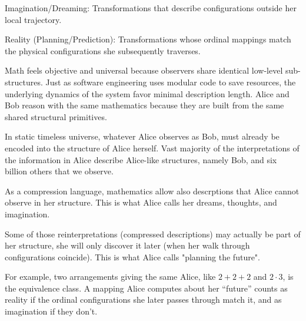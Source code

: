 Imagination/Dreaming: Transformations that describe configurations outside her local trajectory.

Reality (Planning/Prediction): Transformations whose ordinal mappings match the physical configurations she subsequently traverses.

Math feels objective and universal because observers share identical low-level sub-structures. 
Just as software engineering uses modular code to save resources, the underlying dynamics of the system favor minimal description length. 
Alice and Bob reason with the same mathematics because they are built from the same shared structural primitives.

In static timeless universe, whatever Alice observes as Bob, must already be encoded into the structure of Alice herself. Vast majority of 
the interpretations of the information in Alice describe Alice-like structures, namely Bob, and six billion others that we observe.

As a compression language, mathematics allow also descrptions that Alice cannot observe in her structure. This is what Alice calls her 
dreams, thoughts, and imagination.  

Some of those reinterpretations (compressed descriptions) may actually be part of her structure, she will only discover it later (when her 
walk through configurations coincide). This is what Alice calls "planning the future". 

For example, two arrangements giving the same Alice, like $2+2+2$ and $2\cdot3$, is the equivalence class. 
A mapping Alice computes about her “future” counts as reality if the ordinal configurations she later passes through match it, 
and as imagination if they don't. 

